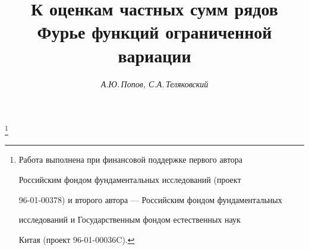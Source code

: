 









\newcommand{\tts}[1]{}


\renewcommand{\baselinestretch}{1.04}







\setcounter{page}{51}















\author{\it А.Ю.\,Попов, С.А.\,Теляковский}




\title{К оценкам частных сумм рядов Фурье функций ограниченной вариации}


\thanks{Работа выполнена при финансовой поддержке первого автора


Российским фондом фундаментальных исследований (проект


96-01-00378) и второго автора --- Российским фондом фундаментальных


исследований и Государственным фондом естественных наук


Китая (проект 96-01-00036C).}





\date{}




\pagestyle{plain} %





